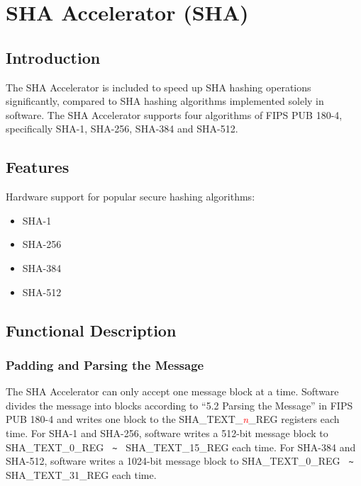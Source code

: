 \documentclass[main\_\_EN.tex]{subfiles}
\begin{document}
\setenglishformatting

\ifglobal
\else
    \listoftodos
    {\let\clearpage\relax \listofdonetodos}
    \tableofcontents
\fi



\hypertarget{sha}{}
\chapter{SHA Accelerator (SHA)}
\label{mod:sha}

\section{Introduction}

The SHA Accelerator is included to speed up SHA hashing operations significantly, compared to SHA hashing algorithms implemented solely in software. The SHA Accelerator supports four algorithms of FIPS PUB 180-4, specifically SHA-1, SHA-256, SHA-384 and SHA-512.


\section{Features}
Hardware support for popular secure hashing algorithms:
\begin{itemize}
    \item SHA-1
    \item SHA-256
    \item SHA-384
    \item SHA-512
\end{itemize}


\section{Functional Description}


\subsection{Padding and Parsing the Message}

The SHA Accelerator can only accept one message block at a time. Software divides the message into blocks according to “5.2 Parsing the Message” in FIPS PUB 180-4 and writes one block to the SHA\_TEXT\_\textcolor{red}{\it{n}}\_REG registers each time. For SHA-1 and SHA-256, software writes a 512-bit message block to SHA\_TEXT\_0\_REG \verb+ ~ + SHA\_TEXT\_15\_REG each time. For SHA-384 and SHA-512, software writes a 1024-bit message block to SHA\_TEXT\_0\_REG \verb+ ~ + SHA\_TEXT\_31\_REG each time.
\end{document}
